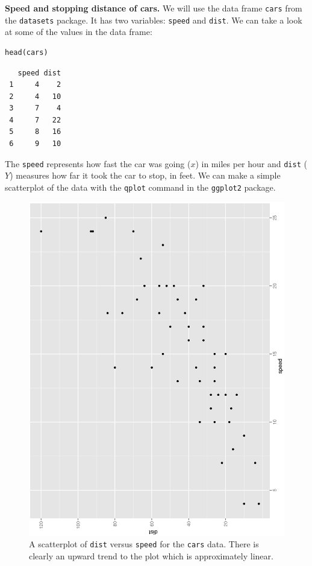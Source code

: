 \documentclass[captions=tableheading]{scrbook}
\begin{document}
\begin{example}
\textbf{Speed and stopping distance of cars.} We will use the data frame \texttt{cars} from the \texttt{datasets} package. It has two variables: \texttt{speed} and \texttt{dist}. We can take a look at some of the values in the data frame: 

\begin{verbatim}
head(cars)
\end{verbatim}

\begin{verbatim}
   speed dist
 1     4    2
 2     4   10
 3     7    4
 4     7   22
 5     8   16
 6     9   10
\end{verbatim}

The \texttt{speed} represents how fast the car was going (\(x\)) in miles per hour and \texttt{dist} (\(Y\)) measures how far it took the car to stop, in feet. We can make a simple scatterplot of the data with the \texttt{qplot} command in the \texttt{ggplot2} package. 

\begin{figure}[th]
  \includegraphics[angle=270, totalheight=4in]{ps/slr/carscatter.ps}
  \caption[Scatterplot of \texttt{dist} versus \texttt{speed} for the \texttt{cars} data]{\small A scatterplot of \texttt{dist} versus \texttt{speed} for the \texttt{cars} data.  There is clearly an upward trend to the plot which is approximately linear.}
  \label{fig-Scatter-cars}
\end{figure}




\end{example}
\end{document}
